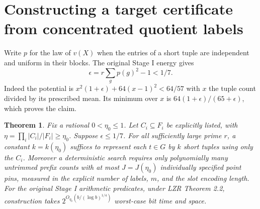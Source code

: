 \documentclass[11pt]{article}
\newtheorem{theorem}{Theorem}
\begin{document}
\section{Constructing a target certificate from concentrated quotient labels}
Write $p$ for the law of $v(X)$ when the entries of a short tuple are independent and uniform in their blocks. The original Stage I energy gives
\[
 \epsilon=r\sum_g p(g)^2-1<1/7.
\]
Indeed the potential is $x^2(1+\epsilon)+64(x-1)^2<64/57$ with $x$ the tuple count divided by its prescribed mean. Its minimum over $x$ is $64(1+\epsilon)/(65+\epsilon)$, which proves the claim.

\begin{theorem}\label{th:trim}
Fix a rational $0<\eta_0\le1$. Let $C_i\subseteq F_i$ be explicitly listed, with $\eta=\prod_i |C_i|/|F_i|\ge\eta_0$. Suppose $\epsilon\le1/7$. For all sufficiently large prime $r$, a constant $k=k(\eta_0)$ suffices to represent \emph{each} $t\in G$ by $k$ short tuples using only the $C_i$. Moreover a deterministic search requires only polynomially many untrimmed prefix counts with at most $J=J(\eta_0)$ individually specified point pins, measured in the explicit number of labels, $m$, and the slot encoding length. For the original Stage I arithmetic predicates, under LZR Theorem 2.2, construction takes $2^{O_{\eta_0}(b/(\log b)^{1/4})}$ worst-case bit time and space.
\end{theorem}
\end{document}
